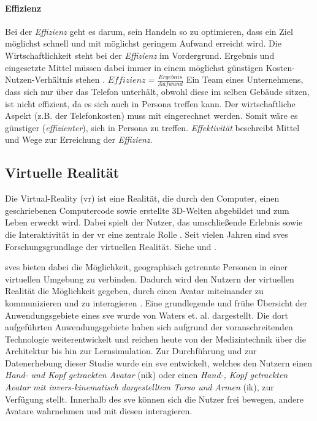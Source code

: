 \documentclass[a4paper,11pt]{article}%
\renewcommand{\\}{\vspace*{0.5\baselineskip} \newline}
\begin{document}
\paragraph{Effizienz}
Bei der \textit{Effizienz} geht es darum, sein Handeln so zu optimieren, dass ein Ziel möglichst schnell und mit möglichst geringem Aufwand erreicht wird. Die Wirtschaftlichkeit steht bei der \textit{Effizienz} im Vordergrund. Ergebnis und eingesetzte Mittel müssen dabei immer in einem möglichst günstigen Kosten-Nutzen-Verhältnis stehen \citep[S.183]{eichhorn2005prinzip}.\\
$Effizienz = \frac{Ergebnis}{Aufwand}$\\
Ein Team eines Unternehmens, dass sich nur über das Telefon unterhält, obwohl diese im selben Gebäude sitzen, ist nicht effizient, da es sich auch in Persona treffen kann.
Der wirtschaftliche Aspekt (z.B. der Telefonkosten) muss mit eingerechnet werden. Somit wäre es günstiger (\textit{effizienter}), sich in Persona zu treffen.
\newline\newline
\textit{Effektivität} beschreibt Mittel und Wege zur Erreichung der \textit{Effizienz}.
\newpage
	\subsection{Virtuelle Realität}
	\label{Virtual Reality}
Die Virtual-Reality (\ac{vr}) ist eine Realität, die durch den Computer, einen geschriebenen Computercode sowie erstellte 3D-Welten abgebildet und zum Leben erweckt wird. Dabei spielt der Nutzer, das umschließende Erlebnis sowie die Interaktivität in der \ac{vr} eine zentrale Rolle \citep[S. 6-12]{sherman2018understanding}.
Seit vielen Jahren sind \ac{sve}s Forschungsgrundlage der virtuellen Realität. Siehe \citep{shuffler2011there} \citep{steed1999leadership} und \citep{de2011level}.

	\ac{sve}s bieten dabei die Möglichkeit, geographisch getrennte Personen in einer virtuellen Umgebung zu verbinden. Dadurch wird den Nutzern der virtuellen Realität die Möglichkeit gegeben, durch einen Avatar miteinander zu kommunizieren und zu interagieren \citep[S. 1-3]{pettifer1999designing}. Eine grundlegende und frühe Übersicht der Anwendungsgebiete eines \ac{sve} wurde von Waters et. al. \citep{waters1997rise} dargestellt. Die dort aufgeführten Anwendungsgebiete haben sich aufgrund der voranschreitenden Technologie weiterentwickelt und reichen heute von der Medizintechnik über die Architektur bis hin zur Lernsimulation.
Zur Durchführung und zur Datenerhebung dieser Studie wurde ein \ac{sve} entwickelt, welches den Nutzern einen \textit{Hand- und Kopf getrackten Avatar} (\ac{nik}) oder einen \textit{Hand-, Kopf getrackten Avatar mit invers-kinematisch dargestelltem Torso und Armen} (\ac{ik}), zur Verfügung stellt. Innerhalb des \ac{sve} können sich die Nutzer frei bewegen, andere Avatare wahrnehmen und mit diesen interagieren.
	
\end{document}
